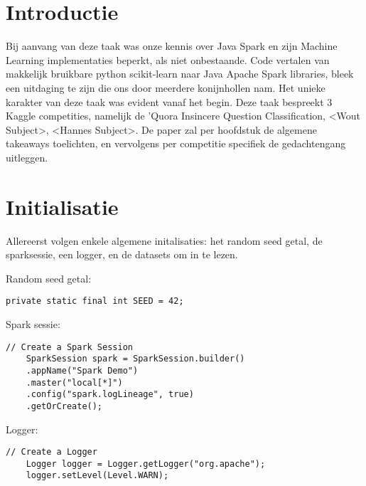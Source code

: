 
\section{Introductie} %
\label{sec:introduction}

Bij aanvang van deze taak was onze kennis over Java Spark en zijn Machine Learning implementaties beperkt, als niet onbestaande. Code vertalen van makkelijk bruikbare python scikit-learn naar Java Apache Spark libraries, bleek een uitdaging te zijn die ons door meerdere konijnhollen nam. Het unieke karakter van deze taak was evident vanaf het begin.
Deze taak bespreekt 3 Kaggle competities, namelijk de 'Quora Insincere Question Classification, <Wout Subject>, <Hannes Subject>. 
De paper zal per hoofdstuk de algemene takeaways toelichten, en vervolgens per competitie specifiek de gedachtengang uitleggen.

\section{Initialisatie}
\label{sec:intialisation}
Allereerst volgen enkele algemene initalisaties: het random seed getal, de sparksessie, een logger, en de datasets om in te lezen.

Random seed getal:

\begin{lstlisting}[style=codeStyle]
    private static final int SEED = 42;
\end{lstlisting}

Spark sessie:
\begin{lstlisting}[style=codeStyle]
// Create a Spark Session
    SparkSession spark = SparkSession.builder()
    .appName("Spark Demo")
    .master("local[*]")
    .config("spark.logLineage", true)
    .getOrCreate();
    \end{lstlisting}

Logger:
\begin{lstlisting}[style=codeStyle]
// Create a Logger
    Logger logger = Logger.getLogger("org.apache");
    logger.setLevel(Level.WARN);
\end{lstlisting}


